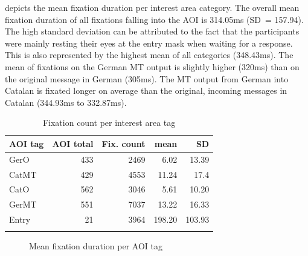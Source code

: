 \documentclass[output=paper]{langscibook}
\begin{document}
 depicts the mean fixation duration per interest area category. The overall mean fixation duration of all fixations falling into the AOI is 314.05ms (SD~= 157.94). The high standard deviation can be attributed to the fact that the participants were mainly resting their eyes at the entry mask when waiting for a response. This is also represented by the highest mean of all categories (348.43ms). The mean of fixations on the German MT output is slightly higher (320ms) than on the original message in German (305ms). The MT output from German into Catalan is fixated longer on average than the original, incoming messages in Catalan (344.93ms to 332.87ms).

\begin{table}
\caption{Fixation count per interest area tag}
\label{tab:fixcount}
 \begin{tabular}{lrrrr}
  \lsptoprule
             AOI tag & AOI total & Fix. count & mean & SD \\ 
  \midrule
  GerO  & 433 & 2469 & 6.02 & 13.39 \\
  CatMT  & 429  & 4553 & 11.24 & 17.4\\
  CatO  & 562  & 3046 & 5.61 & 10.20\\
  GerMT  & 551  & 7037 & 13.22 & 16.33\\
  Entry  & 21 & 3964 & 198.20 & 103.93\\
  \lspbottomrule
 \end{tabular}
\end{table}

\begin{figure}

    \caption{Mean fixation duration per AOI tag}
    \label{fixDur_AOI}
\end{figure}
\end{document}
